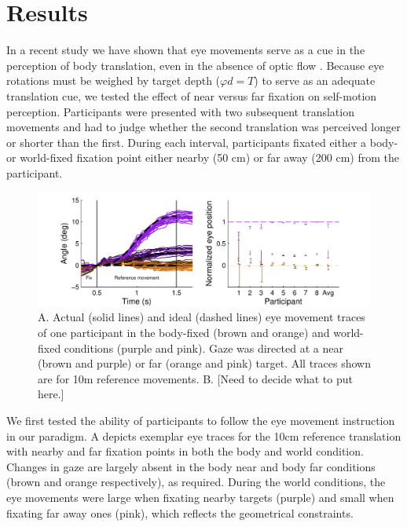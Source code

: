 \section{Results}

In a recent study we have shown that eye movements serve as a cue in the perception of body translation, even in the absence of optic flow \cite{clemens2015a}. Because eye rotations must be weighed by target depth ($\varphi d = T$) to serve as an adequate translation cue, we tested the effect of near versus far fixation on self-motion perception. Participants were presented with two subsequent translation movements  and had to judge whether the second translation was perceived longer or shorter than the first. During each interval, participants fixated either a body- or world-fixed fixation point either nearby (50 cm) or far away (200 cm) from the participant.

\begin{figure}
    \includegraphics[width=1.0\textwidth]{src/paper4/p4_figure2.pdf}

    \caption{A. Actual (solid lines) and ideal (dashed lines) eye movement traces of one participant in the body-fixed (brown and orange) and world-fixed conditions (purple and pink). Gaze was directed at a near (brown and purple) or far (orange and pink) target. All traces shown are for 10m reference movements. B. [Need to decide what to put here.]}
    \label{p4:fig2}
\end{figure}

We first tested the ability of participants to follow the eye movement instruction in our paradigm. A depicts exemplar eye traces for the 10cm reference translation with nearby and far fixation points in both the body and world condition. Changes in gaze are largely absent in the body near and body far conditions (brown and orange respectively), as required. During the world conditions, the eye movements were large when fixating nearby targets (purple) and small when fixating far away ones (pink), which reflects the geometrical constraints. 

